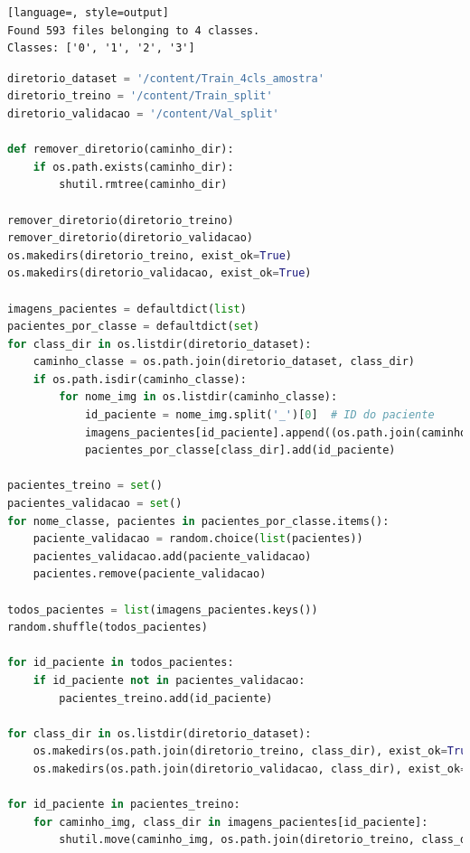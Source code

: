 \begin{lstlisting}[language=, style=output]
Found 593 files belonging to 4 classes.
Classes: ['0', '1', '2', '3']
\end{lstlisting}




\begin{lstlisting}[language=Python, style=input]
diretorio_dataset = '/content/Train_4cls_amostra'
diretorio_treino = '/content/Train_split'
diretorio_validacao = '/content/Val_split'

def remover_diretorio(caminho_dir):
    if os.path.exists(caminho_dir):
        shutil.rmtree(caminho_dir)

remover_diretorio(diretorio_treino)
remover_diretorio(diretorio_validacao)
os.makedirs(diretorio_treino, exist_ok=True)
os.makedirs(diretorio_validacao, exist_ok=True)

imagens_pacientes = defaultdict(list)
pacientes_por_classe = defaultdict(set)
for class_dir in os.listdir(diretorio_dataset):
    caminho_classe = os.path.join(diretorio_dataset, class_dir)
    if os.path.isdir(caminho_classe):
        for nome_img in os.listdir(caminho_classe):
            id_paciente = nome_img.split('_')[0]  # ID do paciente
            imagens_pacientes[id_paciente].append((os.path.join(caminho_classe, nome_img), class_dir))
            pacientes_por_classe[class_dir].add(id_paciente)

pacientes_treino = set()
pacientes_validacao = set()
for nome_classe, pacientes in pacientes_por_classe.items():
    paciente_validacao = random.choice(list(pacientes))
    pacientes_validacao.add(paciente_validacao)
    pacientes.remove(paciente_validacao)

todos_pacientes = list(imagens_pacientes.keys())
random.shuffle(todos_pacientes)

for id_paciente in todos_pacientes:
    if id_paciente not in pacientes_validacao:
        pacientes_treino.add(id_paciente)

for class_dir in os.listdir(diretorio_dataset):
    os.makedirs(os.path.join(diretorio_treino, class_dir), exist_ok=True)
    os.makedirs(os.path.join(diretorio_validacao, class_dir), exist_ok=True)

for id_paciente in pacientes_treino:
    for caminho_img, class_dir in imagens_pacientes[id_paciente]:
        shutil.move(caminho_img, os.path.join(diretorio_treino, class_dir, os.path.basename(caminho_img)))


\end{lstlisting}
